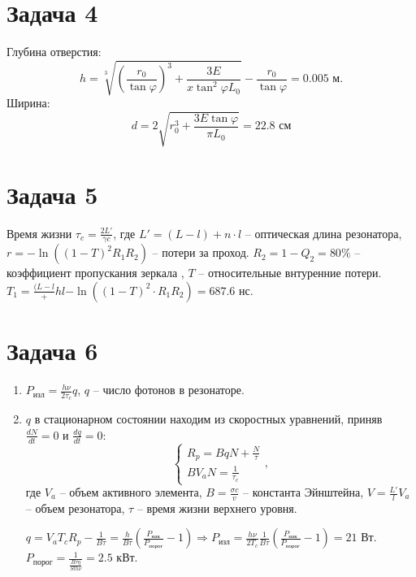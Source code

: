 \documentclass[a4paper, 12pt]{article}
\begin{document}
\section*{Задача 4}
Глубина отверстия:
\begin{equation*}
h=\sqrt[3]{\left(\frac{r_0}{\tan\varphi}\right)^3+\frac{3E}{x\tan^2\varphi L_0}}-\frac{r_0}{\tan\varphi}=0.005\text{ м}.
\end{equation*}
Ширина:
\begin{equation*}
	d=2\sqrt{r_0^3+\frac{3E\tan\varphi}{\pi L_0}}=22.8\text{ см}
\end{equation*}
\section*{Задача 5}
Время жизни $\tau_c=\frac{2L'}{\gamma c}$, где $L'=(L-l)+n\cdot l$ -- оптическая длина резонатора, $r=-\ln\left((1-T)^2R_1R_2\right)$ -- потери за проход. $R_2=1-Q_2=80\%$ -- коэффициент пропускания зеркала , $T$ -- относительные внтуренние потери. $T_1=\frac{(L-l}+hl{-\ln((1-T)^2\cdot R_1R_2)}=687.6$ нс.
\section*{Задача 6}
\begin{enumerate}
	\item $P_{\text{изл}}=\frac{h\nu}{2\tau_c}q$, $q$ -- число фотонов в резонаторе.
	\item $q$ в стационарном состоянии находим из скоростных уравнений, приняв $\frac{dN}{dt}=0$ и $\frac{dq}{dt}=0$:
	\begin{equation*}
		\begin{cases}
			R_p=BqN+\frac{N}{\tau}\\
			BV_aN=\frac{1}{\tau_c}
		\end{cases},
	\end{equation*}
где $V_a$ -- объем активного элемента, $B=\frac{\sigma c}{v}$ -- константа Эйнштейна, $V=\frac{L'}{l}V_a$ -- объем резонатора, $\tau$ -- время жизни верхнего уровня.

$q=V_a T_c R_p-\frac{1}{B\tau}=\frac{h}{B\tau}\left(\frac{P_{\text{нак}}}{P_{\text{порог}}}-1\right)\Rightarrow P_{\text{изл}}=\frac{h\nu}{2 T_c}\frac{1}{B\tau}\left(\frac{P_{\text{нак}}}{P_{\text{порог}}}-1\right)=21$ Вт.\\
$P_{\text{порог}}=\frac{1}{\frac{B\tau\eta}{Slh\nu}}=2.5$ кВт.
\end{enumerate}
\end{document}
